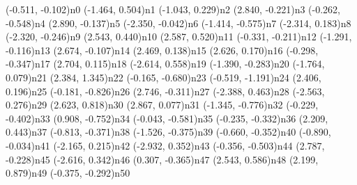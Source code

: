 \dotnode[dotstyle=Btriangle](-0.511, -0.102){n0}
\dotnode[dotstyle=Btriangle](-1.464, 0.504){n1}
\dotnode[dotstyle=Btriangle](-1.043, 0.229){n2}
\dotnode[dotstyle=Bo](2.840, -0.221){n3}
\dotnode[dotstyle=Btriangle](-0.262, -0.548){n4}
\dotnode[dotstyle=Bo](2.890, -0.137){n5}
\dotnode[dotstyle=Btriangle](-2.350, -0.042){n6}
\dotnode[dotstyle=Btriangle](-1.414, -0.575){n7}
\dotnode[dotstyle=Btriangle](-2.314, 0.183){n8}
\dotnode[dotstyle=Btriangle](-2.320, -0.246){n9}
\dotnode[dotstyle=Bsquare](2.543, 0.440){n10}
\dotnode[dotstyle=Bsquare](2.587, 0.520){n11}
\dotnode[dotstyle=Btriangle](-0.331, -0.211){n12}
\dotnode[dotstyle=Btriangle](-1.291, -0.116){n13}
\dotnode[dotstyle=Bo](2.674, -0.107){n14}
\dotnode[dotstyle=Bsquare](2.469, 0.138){n15}
\dotnode[dotstyle=Bsquare](2.626, 0.170){n16}
\dotnode[dotstyle=Btriangle](-0.298, -0.347){n17}
\dotnode[dotstyle=Bsquare](2.704, 0.115){n18}
\dotnode[dotstyle=Btriangle](-2.614, 0.558){n19}
\dotnode[dotstyle=Btriangle](-1.390, -0.283){n20}
\dotnode[dotstyle=Btriangle](-1.764, 0.079){n21}
\dotnode[dotstyle=Bsquare](2.384, 1.345){n22}
\dotnode[dotstyle=Btriangle](-0.165, -0.680){n23}
\dotnode[dotstyle=Btriangle](-0.519, -1.191){n24}
\dotnode[dotstyle=Bsquare](2.406, 0.196){n25}
\dotnode[dotstyle=Btriangle](-0.181, -0.826){n26}
\dotnode[dotstyle=Bo](2.746, -0.311){n27}
\dotnode[dotstyle=Btriangle](-2.388, 0.463){n28}
\dotnode[dotstyle=Btriangle](-2.563, 0.276){n29}
\dotnode[dotstyle=Bsquare](2.623, 0.818){n30}
\dotnode[dotstyle=Bsquare](2.867, 0.077){n31}
\dotnode[dotstyle=Btriangle](-1.345, -0.776){n32}
\dotnode[dotstyle=Btriangle](-0.229, -0.402){n33}
\dotnode[dotstyle=Bo](0.908, -0.752){n34}
\dotnode[dotstyle=Btriangle](-0.043, -0.581){n35}
\dotnode[dotstyle=Btriangle](-0.235, -0.332){n36}
\dotnode[dotstyle=Bsquare](2.209, 0.443){n37}
\dotnode[dotstyle=Btriangle](-0.813, -0.371){n38}
\dotnode[dotstyle=Btriangle](-1.526, -0.375){n39}
\dotnode[dotstyle=Btriangle](-0.660, -0.352){n40}
\dotnode[dotstyle=Btriangle](-0.890, -0.034){n41}
\dotnode[dotstyle=Btriangle](-2.165, 0.215){n42}
\dotnode[dotstyle=Btriangle](-2.932, 0.352){n43}
\dotnode[dotstyle=Btriangle](-0.356, -0.503){n44}
\dotnode[dotstyle=Bo](2.787, -0.228){n45}
\dotnode[dotstyle=Btriangle](-2.616, 0.342){n46}
\dotnode[dotstyle=Btriangle](0.307, -0.365){n47}
\dotnode[dotstyle=Bsquare](2.543, 0.586){n48}
\dotnode[dotstyle=Bsquare](2.199, 0.879){n49}
\dotnode[dotstyle=Btriangle](-0.375, -0.292){n50}
